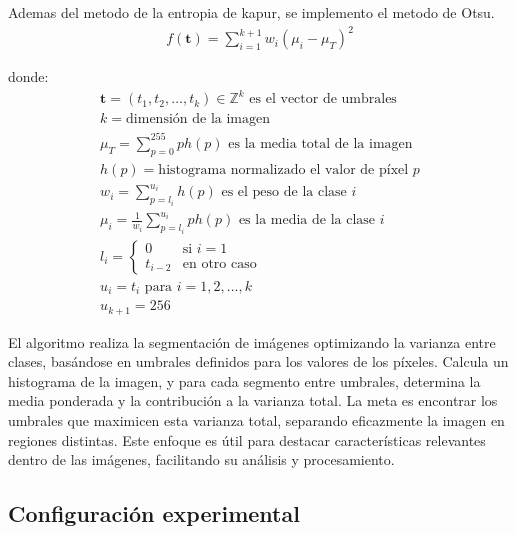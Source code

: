 \documentclass[conference]{IEEEtran}
\begin{document}
\noindent Ademas del metodo de la entropia de kapur, se implemento el metodo de Otsu.
\begin{equation}
\begin{gathered}
f(\mathbf{t})=\sum_{i=1}^{k+1} w_i (\mu_i - \mu_T)^2 
\end{gathered}
\label{eq9}
\end{equation}



donde:
\begin{equation}
\begin{gathered}
\mathbf{t} = (t_1, t_2, \dots, t_k) \in \mathbb{Z}^k \text{ es el vector de umbrales} \\
k = \text{dimensión de la imagen} \\
\mu_T = \sum_{p=0}^{255} p h(p) \text{ es la media total de la imagen} \\
h(p) = \text{histograma normalizado el valor de píxel } p \\
w_i = \sum_{p=l_i}^{u_i} h(p) \text{ es el peso de la clase } i \\
\mu_i = \frac{1}{w_i} \sum_{p=l_i}^{u_i} p h(p) \text{ es la media de la clase } i \\
l_i = \begin{cases}
0 & \text{si } i = 1 \\
t_{i-2} & \text{en otro caso}
\end{cases} \\
u_i = t_i \text{ para } i = 1, 2, \dots, k \\
u_{k+1} = 256
\end{gathered}
\label{eq9}
\end{equation}

\noindent El algoritmo realiza la segmentación de imágenes optimizando la varianza entre clases, basándose en umbrales definidos para los valores de los píxeles. Calcula un histograma de la imagen, y para cada segmento entre umbrales, determina la media ponderada y la contribución a la varianza total. La meta es encontrar los umbrales que maximicen esta varianza total, separando eficazmente la imagen en regiones distintas. Este enfoque es útil para destacar características relevantes dentro de las imágenes, facilitando su análisis y procesamiento.




\subsection{Configuración experimental}
\end{document}
